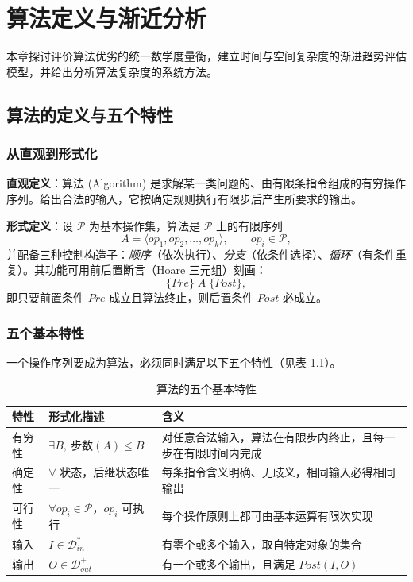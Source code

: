 \clearpage
\begingroup
\let\clearpage\relax
\let\cleardoublepage\relax
\vspace*{\fill}
\chapter{算法定义与渐近分析}
\begin{center}
本章探讨评价算法优劣的统一数学度量衡，建立时间与空间复杂度的渐进趋势评估模型，并给出分析算法复杂度的系统方法。
\end{center}
\vspace*{\fill}
\endgroup
\clearpage


\section{算法的定义与五个特性}

\subsection{从直观到形式化}

\textbf{直观定义}：算法 (Algorithm) 是求解某一类问题的、由有限条指令组成的有穷操作序列。给出合法的输入，它按确定规则执行有限步后产生所要求的输出。

\textbf{形式定义}：设 $\mathcal{P}$ 为基本操作集，算法是 $\mathcal{P}$ 上的有限序列
\begin{equation}
A=\langle op_1,op_2,\dots,op_k\rangle,\qquad op_i\in\mathcal{P},
\end{equation}
并配备三种控制构造子：\emph{顺序}（依次执行）、\emph{分支}（依条件选择）、\emph{循环}（有条件重复）。其功能可用前后置断言（Hoare 三元组）刻画：
\begin{equation}
\{Pre\}\;A\;\{Post\},
\end{equation}
即只要前置条件 $Pre$ 成立且算法终止，则后置条件 $Post$ 必成立。

\subsection{五个基本特性}

一个操作序列要成为算法，必须同时满足以下五个特性（见表 \ref{tab:five_features}）。

\begin{table}[H]
\centering
\caption{算法的五个基本特性}
\label{tab:five_features}
\begin{tabularx}{\textwidth}{l l X}
\toprule
特性 & 形式化描述 & 含义 \\
\midrule
有穷性 & $\exists B,\ \text{步数}(A)\le B$ & 对任意合法输入，算法在有限步内终止，且每一步在有限时间内完成 \\
确定性 & $\forall$ 状态，后继状态唯一 & 每条指令含义明确、无歧义，相同输入必得相同输出 \\
可行性 & $\forall op_i\in\mathcal{P}$，$op_i$ 可执行 & 每个操作原则上都可由基本运算有限次实现 \\
输入 & $I\in\mathcal{D}_{in}^{*}$ & 有零个或多个输入，取自特定对象的集合 \\
输出 & $O\in\mathcal{D}_{out}^{+}$ & 有一个或多个输出，且满足 $Post(I,O)$ \\
\bottomrule
\end{tabularx}
\end{table}

